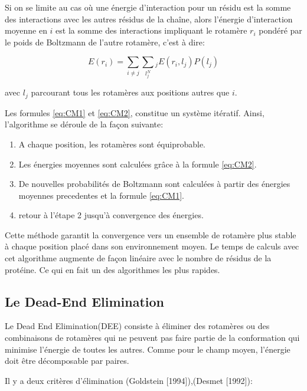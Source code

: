 Si on se limite au cas où une énergie d'interaction pour un résidu est la somme des interactions avec les autres résidus de la chaîne, alors l'énergie d'interaction moyenne en $i$ est la somme des interactions impliquant le rotamère $r_i$ pondéré par le poids de Boltzmann de l'autre rotamère, c'est à dire:

\begin{equation}
    \label{eq:CM2}
E(r_i) = \sum_{i \neq j} \sum_l_j^N_j E(r_i,l_j)P(l_j)
\end{equation}  

avec $l_j$ parcourant tous les rotamères aux positions autres que $i$.

Les formules \ref{eq:CM1} et \ref{eq:CM2}, constitue un système itératif. Ainsi, l'algorithme se déroule de la façon suivante:


\begin{enumerate}
\item  A chaque position, les rotamères sont équiprobable.
\item  Les énergies moyennes sont calculées grâce à la formule \ref{eq:CM2}.
\item  De nouvelles probabilités de Boltzmann sont calculées à partir des énergies moyennes precedentes et la formule \ref{eq:CM1}.
\item  retour à l'étape 2 jusqu'à convergence des énergies.
\end{enumerate}

Cette méthode garantit la convergence vers un ensemble de rotamère plus stable à chaque position placé dans son \og environnement moyen\fg . Le temps de calculs avec cet algorithme augmente  de façon linéaire avec le nombre de résidus de la protéine. Ce qui en fait un des algorithmes les plus rapides.

\subsection{Le Dead-End Elimination}

Le \og Dead End Elimination\fg (DEE)  consiste à éliminer des rotamères ou des combinaisons de rotamères qui ne peuvent pas faire partie de la conformation qui minimise l'énergie de toutes les autres. Comme pour le champ moyen, l'énergie doit être décomposable par paires.

Il y a deux critères d'élimination (Goldstein [1994]),(Desmet [1992]):

